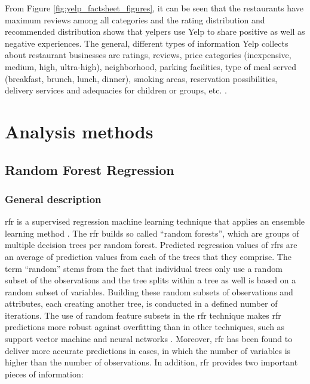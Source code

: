 \documentclass[a4paper, 11pt, oneside]{Thesis}  %
\begin{document}
From Figure \ref{fig:yelp_factsheet_figures}, it can be seen that the restaurants have maximum reviews among all categories and the rating distribution and recommended distribution shows that yelpers use Yelp to share positive as well as negative experiences. The general, different types of information Yelp collects about restaurant businesses are ratings, reviews, price categories (inexpensive, medium, high, ultra-high), neighborhood, parking facilities, type of meal served (breakfast, brunch, lunch, dinner), smoking areas, reservation possibilities, delivery services and adequacies for children or groups, etc. \cite{YelpInc..2018}.  


 
 \chapter{Analysis methods}

\section{Random Forest Regression}
\label{sec:random_forest_regression}

\subsection{General description}

\ac{rfr} is a supervised regression machine learning technique that applies an ensemble learning method \cite{Gromping.2009}. The \ac{rfr} builds so called “random forests”, which are groups of multiple decision trees per random forest. Predicted regression values of \ac{rfr}s are an average of prediction values from each of the trees that they comprise. The term “random” stems from the fact that individual trees only use a random subset of the observations and the tree splits within a tree as well is based on a random subset of variables. Building these random subsets of observations and attributes, each creating another tree, is conducted in a defined number of iterations. The use of random feature subsets in the \ac{rfr} technique makes \ac{rfr} predictions more robust against overfitting than in other techniques, such as support vector machine and neural networks \cite{Liaw.2002}. Moreover, \ac{rfr} has been found to deliver more accurate predictions in cases, in which the number of variables is higher than the number of observations. In addition, \ac{rfr} provides two important pieces of information:
\end{document}
